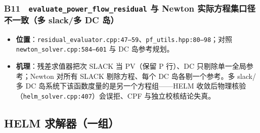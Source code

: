 \documentclass[11pt,a4paper,fontset=fandol]{ctexart}
\newcommand{\file}[1]{\texttt{#1}}
\begin{document}
\subsubsection*{B11　\file{evaluate\_power\_flow\_residual} 与 Newton 实际方程集口径不一致（多 slack/多 DC 岛）}
\begin{itemize}
  \item \textbf{位置}：\file{residual\_evaluator.cpp:47--59}、\file{pf\_utils.hpp:80--98}；对照 \file{newton\_solver.cpp:584--601} 与 DC 岛参考规划。
  \item \textbf{机理}：残差求值器把次 SLACK 当 PV（保留 P 行）、DC 只剔除单一全局参考；Newton 对所有 SLACK 剔除方程、每个 DC 岛各剔一个参考。多 slack/多 DC 岛系统下该函数度量的是另一个方程组——HELM 收敛后物理核验（\file{helm\_solver.cpp:407}）会误拒、CPF 与独立校核结论失真。
\end{itemize}

\subsection{HELM 求解器（一组）}
\end{document}
